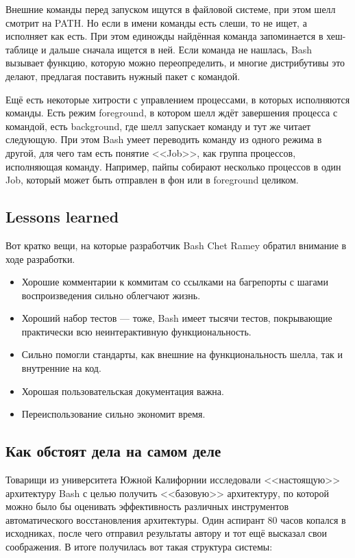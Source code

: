 \documentclass{../text-style}
\begin{document}
Внешние команды перед запуском ищутся в файловой системе, при этом шелл смотрит на PATH. Но если в имени команды есть слеши, то не ищет, а исполняет как есть. При этом единожды найдённая команда запоминается в хеш-таблице и дальше сначала ищется в ней. Если команда не нашлась, Bash вызывает функцию, которую можно переопределить, и многие дистрибутивы это делают, предлагая поставить нужный пакет с командой.

Ещё есть некоторые хитрости с управлением процессами, в которых исполняются команды. Есть режим foreground, в котором шелл ждёт завершения процесса с командой, есть background, где шелл запускает команду и тут же читает следующую. При этом Bash умеет переводить команду из одного режима в другой, для чего там есть понятие <<Job>>, как группа процессов, исполняющая команду. Например, пайпы собирают несколько процессов в один Job, который может быть отправлен в фон или в foreground целиком.

\subsection{Lessons learned}

Вот кратко вещи, на которые разработчик Bash Chet Ramey обратил внимание в ходе разработки.

\begin{itemize}
    \item Хорошие комментарии к коммитам со ссылками на багрепорты с шагами воспроизведения сильно облегчают жизнь.
    \item Хороший набор тестов --- тоже, Bash имеет тысячи тестов, покрывающие практически всю неинтерактивную функциональность.
    \item Сильно помогли стандарты, как внешние на функциональность шелла, так и внутренние на код.
    \item Хорошая пользовательская документация важна.
    \item Переиспользование сильно экономит время.
\end{itemize}

\subsection{Как обстоят дела на самом деле}

Товарищи из университета Южной Калифорнии исследовали <<настоящую>> архитектуру Bash с целью получить <<базовую>> архитектуру, по которой можно было бы оценивать эффективность различных инструментов автоматического восстановления архитектуры. Один аспирант 80 часов копался в исходниках, после чего отправил результаты автору и тот ещё высказал свои соображения. В итоге получилась вот такая структура системы:
\end{document}
